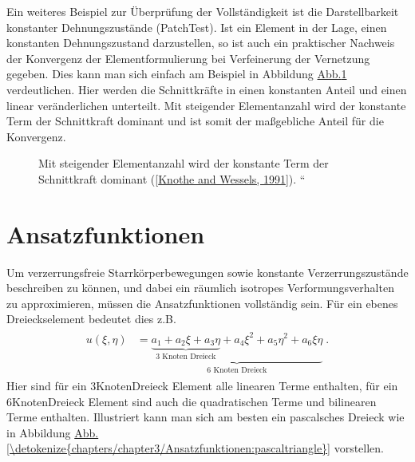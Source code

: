 \documentclass[letterpaper,10pt,german]{jupyterBook}
\let\sphinxpxdimen\pdfpxdimen\else\newdimen\sphinxpxdimen
\begin{document}
\sphinxAtStartPar
Ein weiteres Beispiel zur Überprüfung der Vollständigkeit ist die Darstellbarkeit konstanter Dehnungszustände (Patch\sphinxhyphen{}Test). Ist ein Element in der Lage, einen konstanten Dehnungszustand darzustellen, so ist auch ein praktischer Nachweis der Konvergenz der Elementformulierung bei Verfeinerung der Vernetzung gegeben. Dies kann man sich einfach am Beispiel in Abbildung \hyperref[\detokenize{chapters/chapter3/isoparametrischeFEM:konvergenzpatchtest}]{Abb.\@ \ref{\detokenize{chapters/chapter3/isoparametrischeFEM:konvergenzpatchtest}}} verdeutlichen. Hier werden die Schnittkräfte in einen konstanten Anteil und einen linear veränderlichen unterteilt. Mit steigender Elementanzahl wird der konstante Term der Schnittkraft dominant und ist somit der maßgebliche Anteil für die Konvergenz.

\begin{figure}[htbp]
\centering
\capstart

\noindent\sphinxincludegraphics[width=600\sphinxpxdimen]{{Knothe_02}.png}
\caption{Mit steigender Elementanzahl wird der konstante Term der Schnittkraft dominant ({[}\hyperlink{cite.quellen:id4}{Knothe and Wessels, 1991}{]}).
``}\label{\detokenize{chapters/chapter3/isoparametrischeFEM:konvergenzpatchtest}}
\begin{sphinxlegend}\end{sphinxlegend}
\end{figure}

\sphinxstepscope


\section{Ansatzfunktionen}
\label{\detokenize{chapters/chapter3/Ansatzfunktionen:ansatzfunktionen}}\label{\detokenize{chapters/chapter3/Ansatzfunktionen::doc}}
\sphinxAtStartPar
Um verzerrungsfreie Starrkörperbewegungen sowie konstante Verzerrungszustände beschreiben zu können, und dabei ein räumlich isotropes Verformungsverhalten zu approximieren, müssen die Ansatzfunktionen vollständig sein.
Für ein ebenes Dreieckselement bedeutet dies z.B.
\begin{equation}\label{equation:chapters/chapter3/Ansatzfunktionen:ansatzfunktionenCompleteTriangle}
\begin{split}\begin{align}
u(\xi,\eta) &= \underbrace{\underbrace{ a_1 + a_2 \xi + a_3 \eta}_{\text{3 Knoten Dreieck}} + a_4 \xi^2 + a_5 \eta^2 + a_6 \xi \eta}_{\text{6 Knoten Dreieck}} \; .
\end{align}\end{split}
\end{equation}
\sphinxAtStartPar
Hier sind für ein 3\sphinxhyphen{}Knoten\sphinxhyphen{}Dreieck Element alle linearen Terme enthalten, für ein 6\sphinxhyphen{}Knoten\sphinxhyphen{}Dreieck Element sind auch die quadratischen Terme und bilinearen Terme enthalten.
Illustriert kann man sich am besten ein pascalsches Dreieck wie in Abbildung \hyperref[\detokenize{chapters/chapter3/Ansatzfunktionen:pascaltriangle}]{Abb.\@ \ref{\detokenize{chapters/chapter3/Ansatzfunktionen:pascaltriangle}}} vorstellen.
\end{document}
